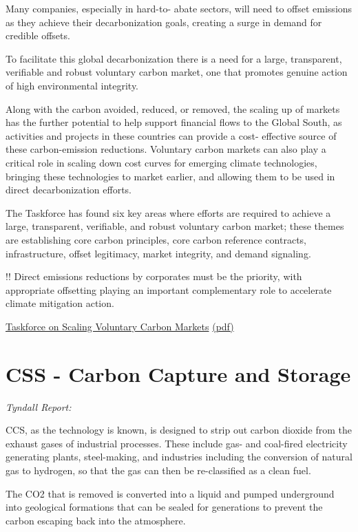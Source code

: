 \documentclass[
]{book}
\begin{document}
Many companies, especially in hard-to-
abate sectors, will need to offset emissions
as they achieve their decarbonization goals,
creating a surge in demand for credible
offsets.

To facilitate this global
decarbonization there is a need for a large,
transparent, verifiable and robust voluntary
carbon market, one that promotes genuine
action of high environmental integrity.

Along with the carbon avoided, reduced, or
removed, the scaling up of markets has the
further potential to help support financial
flows to the Global South, as activities and
projects in these countries can provide a cost-
effective source of these carbon-emission
reductions. Voluntary carbon markets can
also play a critical role in scaling down cost
curves for emerging climate technologies,
bringing these technologies to market earlier,
and allowing them to be used in direct
decarbonization efforts.

The Taskforce has found
six key areas where efforts are required
to achieve a large, transparent, verifiable,
and robust voluntary carbon market;
these themes are establishing core carbon
principles, core carbon reference contracts,
infrastructure, offset legitimacy, market
integrity, and demand signaling.

!! Direct
emissions reductions by corporates must
be the priority, with appropriate offsetting
playing an important complementary role
to accelerate climate mitigation action.

\href{https://www.iif.com/tsvcm}{Taskforce on Scaling Voluntary Carbon Markets}
\href{pdf/TSVCM_2021_Scaling_Carbon_Markets.pdf}{(pdf)}

\hypertarget{css---carbon-capture-and-storage}{%
\chapter{CSS - Carbon Capture and Storage}\label{css---carbon-capture-and-storage}}

\emph{Tyndall Report:}

CCS, as the technology is known, is designed to
strip out carbon dioxide from the exhaust gases of industrial processes.
These include gas- and coal-fired electricity generating plants, steel-making,
and industries including the conversion of natural gas to hydrogen,
so that the gas can then be re-classified as a clean fuel.

The CO2 that is removed is converted into a liquid and pumped underground
into geological formations that can be sealed for generations
to prevent the carbon escaping back into the atmosphere.
\end{document}
